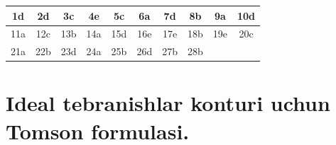 \begin{table}[h!]
\centering
\begin{tabular}{|c|c|c|c|c|c|c|c|c|c|}
\hline
1d & 2d & 3c & 4e & 5c & 6a & 7d & 8b & 9a & 10d \\ \hline
11a & 12c & 13b & 14a & 15d & 16e & 17e & 18b & 19e & 20c \\ \hline
21a & 22b & 23d & 24a & 25b & 26d & 27b & 28b &  &  \\ \hline
\end{tabular}
\end{table}










\section{ Ideal tebranishlar konturi uchun Tomson formulasi.}

